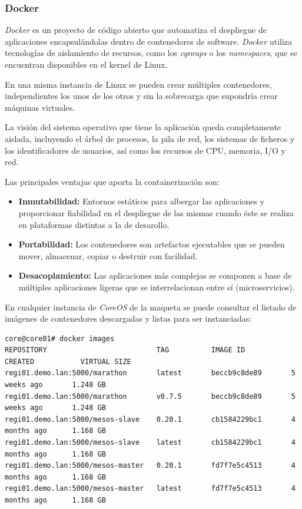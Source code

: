 \documentclass[a4paper,12pt,spanish,final]{epsc_tfc_pfc}
\begin{document}
\subsubsection{Docker}

\emph{Docker} es un proyecto de código abierto que automatiza el despliegue de aplicaciones encapsulándolas dentro de contenedores de software. \emph{Docker} utiliza tecnologías de aislamiento de recursos, como los \emph{cgroups} o los \emph{namespaces}, que se encuentran disponibles en el kernel de Linux.

En una misma instancia de Linux se pueden crear múltiples contenedores, independientes los unos de los otros y sin la sobrecarga que supondría crear máquinas virtuales.

La visión del sistema operativo que tiene la aplicación queda completamente aislada, incluyendo el árbol de procesos, la pila de red, los sistemas de ficheros y los identificadores de usuarios, así como los recursos de CPU, memoria, I/O y red.

Las principales ventajas que aporta la containerización son:
\begin{itemize}
  \item \textbf{Inmutabilidad:} Entornos estáticos para albergar las aplicaciones y proporcionar fiabilidad en el despliegue de las mismas cuando éste se realiza en plataformas distintas a la de desarollo.
  \item \textbf{Portabilidad:} Los contenedores son artefactos ejecutables que se pueden mover, almacenar, copiar o destruir con facilidad.
  \item \textbf{Desacoplamiento:} Las aplicaciones más complejas se componen a base de múltiples aplicaciones ligeras que se interrelacionan entre sí (microservicios).
\end{itemize}

En cualquier instancia de \emph{CoreOS} de la maqueta se puede consultar el listado de imágenes de contenedores descargadas y listas para ser instanciadas:\\

\begin{lstlisting}[style=dnsmasq]
core@core01# docker images
REPOSITORY                          TAG          IMAGE ID           CREATED           VIRTUAL SIZE
regi01.demo.lan:5000/marathon       latest       beccb9c8de89       5 weeks ago       1.248 GB
regi01.demo.lan:5000/marathon       v0.7.5       beccb9c8de89       5 weeks ago       1.248 GB
regi01.demo.lan:5000/mesos-slave    0.20.1       cb1584229bc1       4 months ago      1.168 GB
regi01.demo.lan:5000/mesos-slave    latest       cb1584229bc1       4 months ago      1.168 GB
regi01.demo.lan:5000/mesos-master   0.20.1       fd7f7e5c4513       4 months ago      1.168 GB
regi01.demo.lan:5000/mesos-master   latest       fd7f7e5c4513       4 months ago      1.168 GB
\end{lstlisting}
\end{document}
